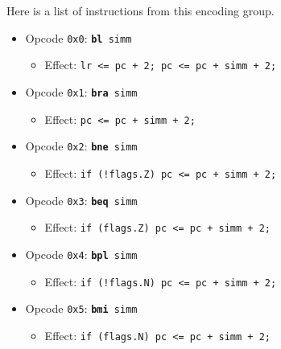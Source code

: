 \documentclass{article}
\begin{document}
	Here is a list of instructions from this encoding group.

	\singlespacing
	\begin{itemize}
		\item Opcode \texttt{0x0}:
			\texttt{\textbf{bl} simm}
		\begin{itemize}
			\item Effect:
				\texttt{lr <= pc + 2; pc <= pc + simm + 2;}
		\end{itemize}

		\item Opcode \texttt{0x1}:
			\texttt{\textbf{bra} simm}
		\begin{itemize}
			\item Effect:
				\texttt{pc <= pc + simm + 2;}
		\end{itemize}

		\item Opcode \texttt{0x2}:
			\texttt{\textbf{bne} simm}
		\begin{itemize}
			\item Effect:
				\texttt{if (!flags.Z) pc <= pc + simm + 2;}
		\end{itemize}

		\item Opcode \texttt{0x3}:
			\texttt{\textbf{beq} simm}
		\begin{itemize}
			\item Effect:
				\texttt{if (flags.Z) pc <= pc + simm + 2;}
		\end{itemize}

		\item Opcode \texttt{0x4}:
			\texttt{\textbf{bpl} simm}
		\begin{itemize}
			\item Effect:
				\texttt{if (!flags.N) pc <= pc + simm + 2;}
		\end{itemize}

		\item Opcode \texttt{0x5}:
			\texttt{\textbf{bmi} simm}
		\begin{itemize}
			\item Effect:
				\texttt{if (flags.N) pc <= pc + simm + 2;}
		\end{itemize}


\end{itemize}
\end{document}
